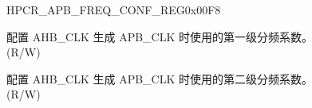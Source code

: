 \begin{register}{H}{PCR\_APB\_FREQ\_CONF\_REG}{0x00F8}\label{regdesc:PCRAPBFREQCONFREG}
%
%
%
\regnewline%
\begin{regdesc}\begin{reglist}
\label{fielddesc:PCRAPBDECREASEDIVNUM}\item [PCR\_APB\_DECREASE\_DIV\_NUM] 配置 AHB\_CLK 生成 APB\_CLK 时使用的第一级分频系数。 \\(R/W)
\label{fielddesc:PCRAPBDIVNUM}\item [PCR\_APB\_DIV\_NUM] 配置 AHB\_CLK 生成 APB\_CLK 时使用的第二级分频系数。\\
(R/W)
\end{reglist}\end{regdesc}
\end{register}


